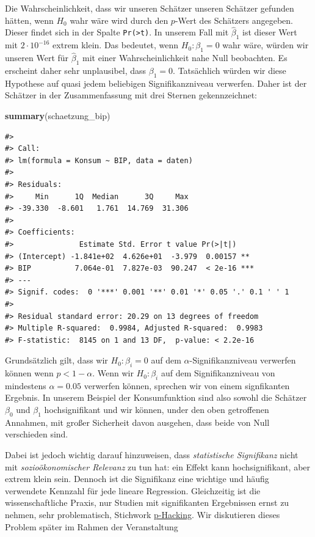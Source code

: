 \documentclass[]{book}
\newenvironment{Shaded}{\begin{snugshade}}{\end{snugshade}}
\newcommand{\KeywordTok}[1]{\textcolor[rgb]{0.13,0.29,0.53}{\textbf{#1}}}
\newcommand{\NormalTok}[1]{#1}
\begin{document}
Die Wahrscheinlichkeit, dass wir unseren Schätzer unseren Schätzer
gefunden hätten, wenn \(H_0\) wahr wäre wird durch den \(p\)-Wert des
Schätzers angegeben. Dieser findet sich in der Spalte
\texttt{Pr(\textgreater{}\textbar{}t\textbar{})}. In unserem Fall mit
\(\hat{\beta}_1\) ist dieser Wert mit \(2\cdot 10^{-16}\) extrem klein.
Das bedeutet, wenn \(H_0: \beta_1=0\) wahr wäre, würden wir unseren Wert
für \(\hat{\beta}_1\) mit einer Wahrscheinlichkeit nahe Null beobachten.
Es erscheint daher sehr unplausibel, dass \(\beta_1=0\). Tatsächlich
würden wir diese Hypothese auf quasi jedem beliebigen Signifikanzniveau
verwerfen. Daher ist der Schätzer in der Zusammenfassung mit drei
Sternen gekennzeichnet:

\begin{Shaded}
\begin{Highlighting}[]
\KeywordTok{summary}\NormalTok{(schaetzung_bip)}
\end{Highlighting}
\end{Shaded}

\begin{verbatim}
#> 
#> Call:
#> lm(formula = Konsum ~ BIP, data = daten)
#> 
#> Residuals:
#>     Min      1Q  Median      3Q     Max 
#> -39.330  -8.601   1.761  14.769  31.306 
#> 
#> Coefficients:
#>               Estimate Std. Error t value Pr(>|t|)    
#> (Intercept) -1.841e+02  4.626e+01  -3.979  0.00157 ** 
#> BIP          7.064e-01  7.827e-03  90.247  < 2e-16 ***
#> ---
#> Signif. codes:  0 '***' 0.001 '**' 0.01 '*' 0.05 '.' 0.1 ' ' 1
#> 
#> Residual standard error: 20.29 on 13 degrees of freedom
#> Multiple R-squared:  0.9984, Adjusted R-squared:  0.9983 
#> F-statistic:  8145 on 1 and 13 DF,  p-value: < 2.2e-16
\end{verbatim}

Grundsätzlich gilt, dass wir \(H_0: \beta_i = 0\) auf dem
\(\alpha\)-Signifikanzniveau verwerfen können wenn \(p<1-\alpha\). Wenn
wir \(H_0: \beta_i\) auf dem Signifikanzniveau von mindestens
\(\alpha=0.05\) verwerfen können, sprechen wir von einem signfikanten
Ergebnis. In unserem Beispiel der Konsumfunktion sind also sowohl die
Schätzer \(\beta_0\) und \(\beta_1\) hochsignifikant und wir können,
under den oben getroffenen Annahmen, mit großer Sicherheit davon
ausgehen, dass beide von Null verschieden sind.

Dabei ist jedoch wichtig darauf hinzuweisen, dass \emph{statistische
Signifikanz} nicht mit \emph{sozioökonomischer Relevanz} zu tun hat: ein
Effekt kann hochsignifikant, aber extrem klein sein. Dennoch ist die
Signifikanz eine wichtige und häufig verwendete Kennzahl für jede
lineare Regression. Gleichzeitig ist die wissenschaftliche Praxis, nur
Studien mit signifikanten Ergebnissen ernst zu nehmen, sehr
problematisch, Stichwork
\href{https://de.wikipedia.org/wiki/P-Hacking}{p-Hacking}. Wir
diskutieren dieses Problem später im Rahmen der Veranstaltung
\end{document}
